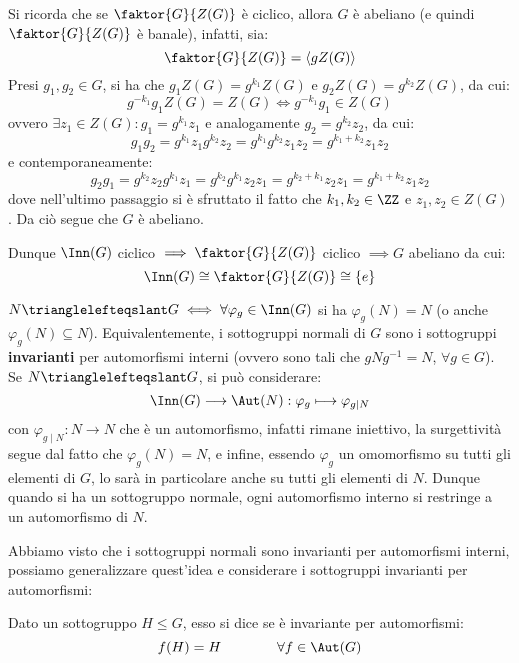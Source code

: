 \documentclass[11pt]{scrartcl}
\begin{document}
\begin{remark}
    Si ricorda che se $\faktor{G}{Z(G)}$ è ciclico, allora $G$ è abeliano (e quindi $\faktor{G}{Z(G)}$ è banale), infatti, sia:
        \[ \faktor{G}{Z(G)} = \left<gZ(G)\right>
            \]
    Presi $g_1,g_2 \in G$, si ha che $g_1Z(G) = g^{k_1}Z(G)$ e $g_2Z(G) = g^{k_2}Z(G)$, da cui:
        \[ g^{-k_1}g_1Z(G) = Z(G) \iff  g^{-k_1}g_1 \in Z(G)
            \]
    ovvero $\exists z_1 \in Z(G): g_1 = g^{k_1}z_1$ e analogamente $g_2 = g^{k_2}z_2$, da cui:
        \[ g_1g_2 = g^{k_1}z_1g^{k_2}z_2 = g^{k_1}g^{k_2}z_1z_2 = g^{k_1+k_2}z_1z_2
            \]
    e contemporaneamente:
        \[ g_2g_1 = g^{k_2}z_2g^{k_1}z_1 = g^{k_2}g^{k_1}z_2z_1 = g^{k_2 + k_1}z_2z_1 = g^{k_1+k_2}z_1z_2
            \]
    dove nell'ultimo passaggio si è sfruttato il fatto che $k_1,k_2 \in \ZZ$ e $z_1,z_2 \in Z(G)$. Da ciò segue che $G$ è abeliano.
\end{remark}

\begin{remark}
    Dunque $\Inn(G)$ ciclico $\implies \faktor{G}{Z(G)}$ ciclico $\implies G$ abeliano da cui:  
        \[ \Inn(G) \cong \faktor{G}{Z(G)} \cong \{e\}
            \]
\end{remark}

\begin{remark}
    $N \trianglelefteqslant G \iff \forall \varphi_g \in \Inn(G)$ si ha $\varphi_g(N) = N$ (o anche $\varphi_g(N) \subseteq N$). Equivalentemente, i sottogruppi
    normali di $G$ sono i sottogruppi \textbf{invarianti} per automorfismi interni (ovvero sono tali che $gNg^{-1} = N$, $\forall g \in G$). Se $N \trianglelefteqslant G$, si può considerare:
        \[ \Inn(G) \longrightarrow \Aut(N) : \varphi_g \longmapsto \varphi_{g \mid N}
            \]
    con $\varphi_{g \mid N} : N \longrightarrow N$ che è un automorfismo, infatti rimane iniettivo, la surgettività segue dal fatto che $\varphi_g(N) = N$, e infine, essendo $\varphi_g$ 
    un omomorfismo su tutti gli elementi di $G$, lo sarà in particolare anche su tutti gli elementi di $N$. Dunque quando si ha un sottogruppo normale, ogni automorfismo interno si restringe
    a un automorfismo di $N$.
\end{remark}

Abbiamo visto che i sottogruppi normali sono invarianti per automorfismi interni, possiamo generalizzare quest'idea e considerare i sottogruppi invarianti per automorfismi:

\begin{definition}
    Dato un sottogruppo $H \leqslant G$, esso si dice  se è invariante per automorfismi:
        \[ f(H) = H
        \qquad \qquad \forall f \in \Aut(G)
            \]
\end{definition}
\end{document}
